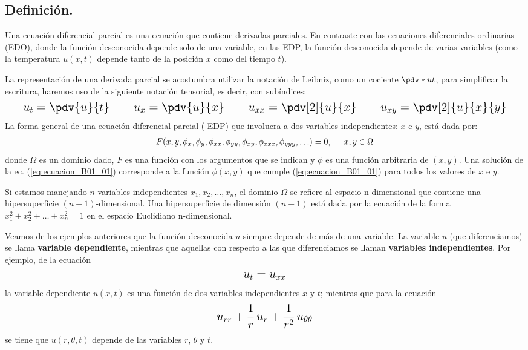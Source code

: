 \subsection*{Definición.}
Una ecuación diferencial parcial es una ecuación que contiene derivadas parciales. En contraste con las ecuaciones diferenciales ordinarias (EDO), donde la función desconocida depende solo de una variable, en las EDP, la función desconocida depende de varias variables (como la temperatura $u (x, t)$ depende tanto de la posición $x$ como del tiempo $t$).
\par
La representación de una derivada parcial se acostumbra utilizar la notación de Leibniz, como un cociente $\pdv*{u}{t}$, para simplificar la escritura, haremos uso de la siguiente notación tensorial, es decir, con subíndices:
\begin{align*}
\text{\Large{$
u_{t} = \pdv{u}{t} \hspace{1cm} u_{x} = \pdv{u}{x} \hspace{1cm} u_{xx} = \pdv[2]{u}{x} \hspace{1cm} u_{xy} = \pdv[2]{u}{x}{y}$}}
\end{align*}
La forma general de una ecuación diferencial parcial ( EDP) que involucra a dos variables independientes: $x$ e $y$, está dada por:
\begin{align}
F(x, y, \phi_{x}, \phi_{y}, \phi_{xx}, \phi_{yy}, \phi_{xy}, \phi_{xxx}, \phi_{yyy}, \ldots) = 0, \hspace{0.5cm} x, y \in \Omega
\label{eq:ecuacion_B01_01}
\end{align}
donde $\Omega$ es un dominio dado, $F$ es una función con los argumentos que se indican y $\phi$ es una función arbitraria de $(x, y)$. Una solución de la ec. (\ref{eq:ecuacion_B01_01}) corresponde a la función $\phi(x, y)$ que cumple (\ref{eq:ecuacion_B01_01}) para todos los valores de $x$ e $y$.
\par
Si estamos manejando $n$ variables independientes $x_{1}, x_{2}, \ldots, x_{n}$, el dominio $\Omega$ se refiere al espacio n-dimensional que contiene una hipersuperficie $(n-1)$-dimensional. Una hipersuperficie de dimensión $(n-1)$ está dada por la ecuación de la forma $x_{1}^{2} + x_{2}^{2} + \ldots + x_{n}^{2} = 1$ en el espacio Euclidiano n-dimensional.
\par
Veamos de los ejemplos anteriores que la función desconocida $u$ siempre depende de más de una variable. La variable $u$ (que diferenciamos) se llama \textbf{variable dependiente}, mientras que aquellas con respecto a las que diferenciamos se llaman \textbf{variables independientes}. Por ejemplo, de la ecuación
\begin{align*}
\text{\Large{$u_{t} = u_{xx}$}}
\end{align*}
la variable dependiente $u(x, t)$ es una función de dos variables independientes $x$ y $t$; mientras que para la ecuación
\begin{align*}
\text{\Large{$u_{rr} + \dfrac{1}{r} \, u_{r} + \dfrac{1}{r^{2}} \, u_{\theta \theta}$}}
\end{align*}
se tiene que $u(r, \theta, t)$ depende de las variables $r$, $\theta$ y $t$.
